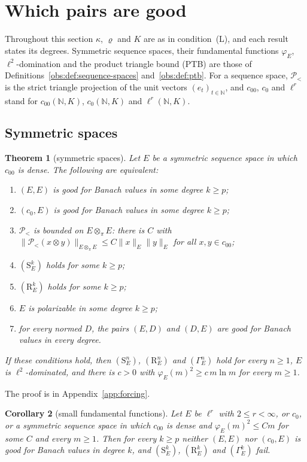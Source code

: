 \documentclass[11pt]{amsart}
\newtheorem{theorem}{Theorem}[section]
\newtheorem{corollary}[theorem]{Corollary}
\theoremstyle{definition}
\theoremstyle{remark}
\numberwithin{equation}{section}
\newcommand{\N}{\mathbb N}
\newcommand{\norm}[1]{\lVert #1\rVert}
\theoremstyle{plain}
\theoremstyle{definition}
\theoremstyle{plain}
\newcommand{\cP}{\mathcal P}
\begin{document}
\section{Which pairs are good}\label{sec:classification}

Throughout this section $\kappa$, $\varrho$ and $K$ are as in condition~\textup{(L)}, and each result states its degrees. Symmetric sequence spaces,
their fundamental functions $\varphi_E$, $\ell^2$\nobreakdash-domination and the product triangle bound \textup{(PTB)}
are those of Definitions~\ref{obs:def:sequence-spaces} and~\ref{obs:def:ptb}. For a sequence space, $\cP_<$ is the
strict triangle projection of the unit vectors $(e_t)_{t\in\N}$, and $c_{00}$, $c_0$ and $\ell^r$ stand for
$c_{00}(\N,K)$, $c_0(\N,K)$ and $\ell^r(\N,K)$.

\subsection{Symmetric spaces}

\begin{theorem}[symmetric spaces]\label{cls:thm:symmetric}
Let $E$ be a symmetric sequence space in which $c_{00}$ is dense. The following are equivalent:
\begin{enumerate}
\item $(E,E)$ is good for Banach values in some degree $k\ge p$;
\item $(c_0,E)$ is good for Banach values in some degree $k\ge p$;
\item $\cP_<$ is bounded on $E\otimes_\pi E$: there is $C$ with
$\norm{\cP_<(x\otimes y)}_{E\otimes_\pi E}\le C\norm x_E\norm y_E$ for all $x,y\in c_{00}$;
\item $(\mathrm S^k_E)$ holds for some $k\ge p$;
\item $(\mathrm R^k_E)$ holds for some $k\ge p$;
\item $E$ is polarizable in some degree $k\ge p$;
\item for every normed $D$, the pairs $(E,D)$ and $(D,E)$ are good for Banach values in every degree.
\end{enumerate}
If these conditions hold, then $(\mathrm S^n_E)$, $(\mathrm R^n_E)$ and $(\Gamma^n_E)$ hold for every $n\ge1$, $E$ is
$\ell^2$\nobreakdash-dominated, and there is $c>0$ with $\varphi_E(m)^2\ge c\,m\ln m$ for every $m\ge1$.
\end{theorem}

The proof is in Appendix~\ref{app:forcing}.

\begin{corollary}[small fundamental functions]\label{cls:cor:symmetric-examples}
Let $E$ be $\ell^r$ with $2\le r<\infty$, or $c_0$, or a symmetric sequence space in which $c_{00}$ is dense and
$\varphi_E(m)^2\le Cm$ for some $C$ and every $m\ge1$. Then for every $k\ge p$ neither $(E,E)$ nor $(c_0,E)$ is good for
Banach values in degree $k$, and $(\mathrm S^k_E)$, $(\mathrm R^k_E)$ and $(\Gamma^k_E)$ fail.
\end{corollary}
\end{document}
